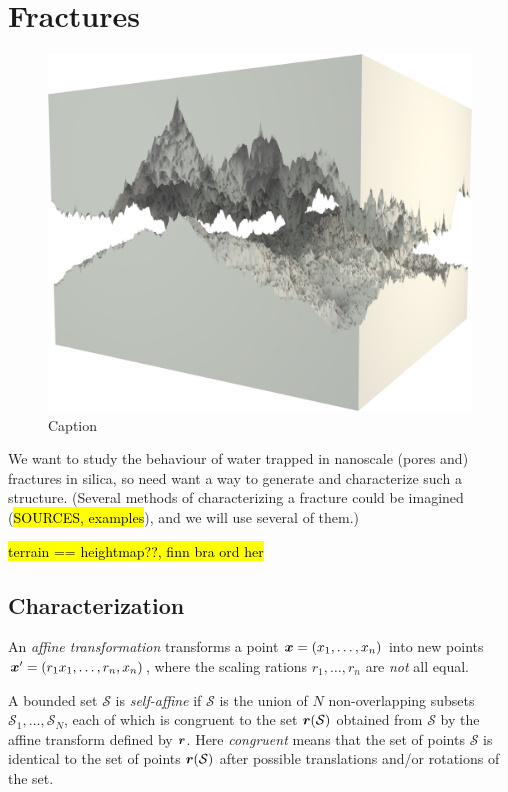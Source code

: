 \chapter{Fractures}

\begin{figure}[h!]
    \centering
    \includegraphics[width=\textwidth]{images/fracture/large_fracture05}
    \caption{Caption}
\end{figure}

We want to study the behaviour of water trapped in nanoscale (pores and) fractures in silica, so need want a way to generate and characterize such a structure. (Several methods of characterizing a fracture could be imagined (\hl{SOURCES, examples}), and we will use several of them.)        

\hl{terrain == heightmap??, finn bra ord her}

\section{Characterization}

An \emph{affine transformation} transforms a point $\bm{x} = (x_1, \dots, x_n)$ into new points $\bm{x}' = (r_1x_1, \dots, r_n, x_n)$, where the scaling rations $r_1, \dots, r_n$ are \emph{not} all equal.

A bounded set $\mathcal{S}$ is \emph{self-affine} if $\mathcal{S}$ is the union of $N$ non-overlapping subsets $\mathcal{S}_1, \dots, \mathcal{S}_N$, each of which is congruent to the set $\bm{r}(\mathcal{S})$ obtained from $\mathcal S$ by the affine transform defined by $\bm{r}$. Here \emph{congruent} means that the set of points $\mathcal{S}$ is identical to the set of points $\bm{r}(\mathcal{S})$ after possible translations and/or rotations of the set\cite{feder1988fractals}.

